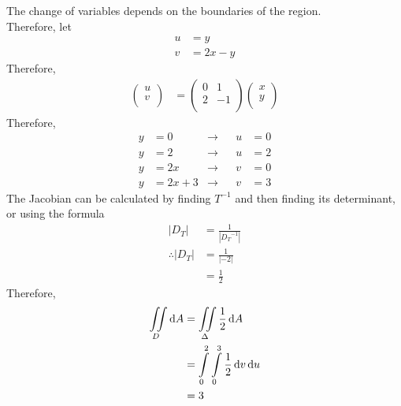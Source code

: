 \documentclass[fleqn, a4paper, 12pt, twoside]{article}
\theoremstyle{definition}
\theoremstyle{theorem}
\begin{document}
\begin{solution}
\begin{figure}[H]
	\end{figure}
	The change of variables depends on the boundaries of the region.\\
	Therefore, let
	\begin{align*}
		u & = y \\
		v & = 2 x - y
	\end{align*}
	Therefore,
	\begin{align*}
			\begin{pmatrix}
				u \\
				v \\
			\end{pmatrix}
		&=
			\begin{pmatrix}
				0 & 1  \\
				2 & -1 \\
			\end{pmatrix}
			\begin{pmatrix}
				x \\
				y \\
			\end{pmatrix}
	\end{align*}
	Therefore, 
	\begin{align*}
		y & = 0       & \to &  & u & = 0 \\
		y & = 2       & \to &  & u & = 2 \\
		y & = 2 x     & \to &  & v & = 0 \\
		y & = 2 x + 3 & \to &  & v & = 3
	\end{align*}
	The Jacobian can be calculated by finding $T^{-1}$ and then finding its determinant, or using the formula
	\begin{align*}
		|D_T| &= \frac{1}{|{D_T}^{-1}|}\\
		\therefore |D_T| &= \frac{1}{|-2|}\\
		&= \frac{1}{2}
	\end{align*}
	Therefore,
	\begin{align*}
		\iint\limits_{D} \dif A & = \iint\limits_{\Delta} \frac{1}{2} \dif A                         \\
                                        & =\int\limits_{0}^{2} \int\limits_{0}^{3} \frac{1}{2} \dif v \dif u \\
		&= 3
	\end{align*}
\end{solution}
\end{document}
